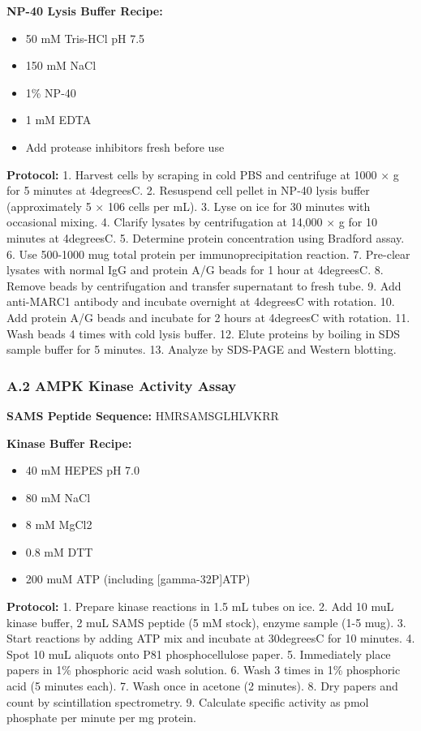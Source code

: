 \documentclass[11pt,a4paper]{article}
\begin{document}
\textbf{NP-40 Lysis Buffer Recipe:}
\begin{itemize}
\item 50 mM Tris-HCl pH 7.5
\item 150 mM NaCl
\item 1\% NP-40
\item 1 mM EDTA
\item Add protease inhibitors fresh before use
\end{itemize}

\textbf{Protocol:}
1. Harvest cells by scraping in cold PBS and centrifuge at 1000 × g for 5 minutes at 4degreesC.
2. Resuspend cell pellet in NP-40 lysis buffer (approximately 5 × 106 cells per mL).
3. Lyse on ice for 30 minutes with occasional mixing.
4. Clarify lysates by centrifugation at 14,000 × g for 10 minutes at 4degreesC.
5. Determine protein concentration using Bradford assay.
6. Use 500-1000 mug total protein per immunoprecipitation reaction.
7. Pre-clear lysates with normal IgG and protein A/G beads for 1 hour at 4degreesC.
8. Remove beads by centrifugation and transfer supernatant to fresh tube.
9. Add anti-MARC1 antibody and incubate overnight at 4degreesC with rotation.
10. Add protein A/G beads and incubate for 2 hours at 4degreesC with rotation.
11. Wash beads 4 times with cold lysis buffer.
12. Elute proteins by boiling in SDS sample buffer for 5 minutes.
13. Analyze by SDS-PAGE and Western blotting.

\subsubsection*{A.2 AMPK Kinase Activity Assay}

\textbf{SAMS Peptide Sequence:} HMRSAMSGLHLVKRR

\textbf{Kinase Buffer Recipe:}
\begin{itemize}
\item 40 mM HEPES pH 7.0
\item 80 mM NaCl
\item 8 mM MgCl2
\item 0.8 mM DTT
\item 200 muM ATP (including [gamma-32P]ATP)
\end{itemize}

\textbf{Protocol:}
1. Prepare kinase reactions in 1.5 mL tubes on ice.
2. Add 10 muL kinase buffer, 2 muL SAMS peptide (5 mM stock), enzyme sample (1-5 mug).
3. Start reactions by adding ATP mix and incubate at 30degreesC for 10 minutes.
4. Spot 10 muL aliquots onto P81 phosphocellulose paper.
5. Immediately place papers in 1\% phosphoric acid wash solution.
6. Wash 3 times in 1\% phosphoric acid (5 minutes each).
7. Wash once in acetone (2 minutes).
8. Dry papers and count by scintillation spectrometry.
9. Calculate specific activity as pmol phosphate per minute per mg protein.
\end{document}
